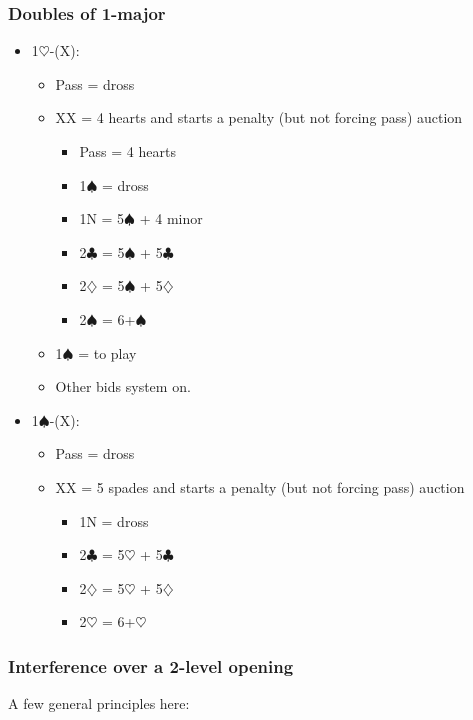 \documentclass[a4paper,14pt]{extarticle}
\begin{document}
\subsubsection{Doubles of 1-major}
\label{sec:intf:1M}

\begin{itemize}
\item 1$\heartsuit$-(X):
	\begin{itemize}
	\item Pass = dross
	\item XX = 4 hearts and starts a penalty (but not forcing pass) auction
		\begin{itemize}
		\item Pass = 4 hearts
		\item 1$\spadesuit$ = dross
		\item 1N = 5$\spadesuit$ + 4 minor
		\item 2$\clubsuit$ = 5$\spadesuit$ + 5$\clubsuit$
		\item 2$\diamondsuit$ = 5$\spadesuit$ + 5$\diamondsuit$
		\item 2$\spadesuit$ = 6+$\spadesuit$
		\end{itemize}
	\item 1$\spadesuit$ = to play
	\item Other bids system on.
	\end{itemize}
\item 1$\spadesuit$-(X):
	\begin{itemize}
	\item Pass = dross
	\item XX = 5 spades and starts a penalty (but not forcing pass) auction
		\begin{itemize}
		\item 1N = dross
		\item 2$\clubsuit$ = 5$\heartsuit$ + 5$\clubsuit$
		\item 2$\diamondsuit$ = 5$\heartsuit$ + 5$\diamondsuit$
		\item 2$\heartsuit$ = 6+$\heartsuit$
		\end{itemize}
	\end{itemize}
\end{itemize}

\newpage
\subsubsection{Interference over a 2-level opening}
\label{sec:intf:2level}

A few general principles here:
\end{document}
